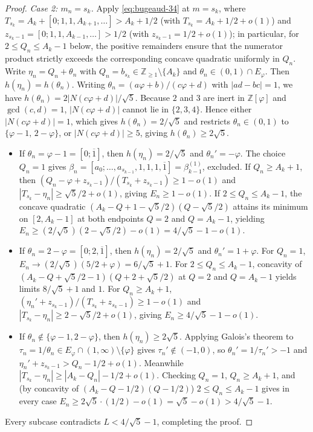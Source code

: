 \documentclass[11pt]{amsart}
\theoremstyle{definition}
\theoremstyle{remark}
\numberwithin{equation}{section}
\newcommand{\Z}{\mathbb{Z}}
\begin{document}
\begin{proof}
\emph{Case 2: $m_n=s_k$.}
Apply \eqref{eq:bugeaud-34} at $m=s_k$, where
$T_{s_k}=A_k+[0;1,1,A_{k+1},\ldots]>A_k+1/2$ (with
$T_{s_k}=A_k+1/2+o(1)$) and
$z_{s_k-1}=[0;1,1,A_{k-1},\ldots]>1/2$ (with $z_{s_k-1}=1/2+o(1)$); in
particular, for $2\le Q_n\le A_k-1$ below, the positive remainders
ensure that the numerator product strictly exceeds the corresponding
concave quadratic uniformly in $Q_n$. Write $\eta_n=Q_n+\theta_n$ with
$Q_n=b_{s_k}\in\Z_{\ge1}\setminus\{A_k\}$ and
$\theta_n\in(0,1)\cap E_\varphi$. Then $h(\eta_n)=h(\theta_n)$. Writing
$\theta_n=(a\varphi+b)/(c\varphi+d)$ with $|ad-bc|=1$, we have
$h(\theta_n)=2|N(c\varphi+d)|/\sqrt5$. Because $2$ and $3$ are inert in
$\Z[\varphi]$ and $\gcd(c,d)=1$, $|N(c\varphi+d)|$ cannot lie in
$\{2,3,4\}$. Hence either $|N(c\varphi+d)|=1$, which gives
$h(\theta_n)=2/\sqrt5$ and restricts $\theta_n\in(0,1)$ to
$\{\varphi-1,\,2-\varphi\}$, or $|N(c\varphi+d)|\ge5$, giving
$h(\theta_n)\ge2\sqrt5$.
\begin{itemize}
\item If $\theta_n=\varphi-1=[0;\overline1]$, then $h(\eta_n)=2/\sqrt5$
      and $\theta_n'=-\varphi$. The choice $Q_n=1$ gives
      $\beta_n=[a_0;\ldots,a_{s_{k-1}},1,1,1,\overline1]=\beta_{k-1}^{(1)}$,
      excluded. If $Q_n\ge A_k+1$, then
      $(Q_n-\varphi+z_{s_k-1})/(T_{s_k}+z_{s_k-1})\ge1-o(1)$ and
      $|T_{s_k}-\eta_n|\ge\sqrt5/2+o(1)$, giving $E_n\ge1-o(1)$. If
      $2\le Q_n\le A_k-1$, the concave quadratic
      $(A_k-Q+1-\sqrt5/2)(Q-\sqrt5/2)$ attains its minimum on
      $[2,A_k-1]$ at both endpoints $Q=2$ and $Q=A_k-1$, yielding
      $E_n\ge(2/\sqrt5)(2-\sqrt5/2)-o(1)=4/\sqrt5-1-o(1)$.
\item If $\theta_n=2-\varphi=[0;2,\overline1]$, then $h(\eta_n)=2/\sqrt5$
      and $\theta_n'=1+\varphi$. For $Q_n=1$,
      $E_n\to(2/\sqrt5)(5/2+\varphi)=6/\sqrt5+1$. For $2\le Q_n\le A_k-1$,
      concavity of $(A_k-Q+\sqrt5/2-1)(Q+2+\sqrt5/2)$ at $Q=2$ and
      $Q=A_k-1$ yields limits $8/\sqrt5+1$ and $1$. For $Q_n\ge A_k+1$,
      $(\eta_n'+z_{s_k-1})/(T_{s_k}+z_{s_k-1})\ge1-o(1)$ and
      $|T_{s_k}-\eta_n|\ge2-\sqrt5/2+o(1)$, giving
      $E_n\ge4/\sqrt5-1-o(1)$.
\item If $\theta_n\notin\{\varphi-1,2-\varphi\}$, then
      $h(\eta_n)\ge2\sqrt5$. Applying Galois's theorem to
      $\tau_n=1/\theta_n\in E_\varphi\cap(1,\infty)\setminus\{\varphi\}$
      gives $\tau_n'\notin(-1,0)$, so $\theta_n'=1/\tau_n'>-1$ and
      $\eta_n'+z_{s_k-1}>Q_n-1/2+o(1)$. Meanwhile
      $|T_{s_k}-\eta_n|\ge|A_k-Q_n|-1/2+o(1)$. Checking $Q_n=1$,
      $Q_n\ge A_k+1$, and (by concavity of $(A_k-Q-1/2)(Q-1/2)$)
      $2\le Q_n\le A_k-1$ gives in every case
      $E_n\ge 2\sqrt5\cdot(1/2)-o(1)=\sqrt5-o(1)>4/\sqrt5-1$.
\end{itemize}
Every subcase contradicts $L<4/\sqrt5-1$, completing the proof.
\end{proof}
\end{document}

